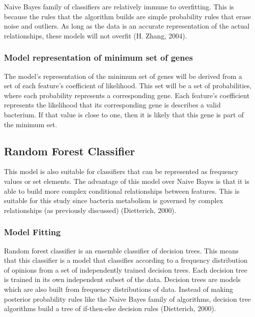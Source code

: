 \documentclass[]{report}
\begin{document}
Naive Bayes family of classifiers are relatively immune to overfitting.
This is because the rules that the algorithm builds are simple
probability rules that erase noise and outliers. As long as the data is
an accurate representation of the actual relationships, these models
will not overfit (H. Zhang, 2004).

\subsubsection{Model representation of minimum set of
genes}\label{model-representation-of-minimum-set-of-genes}

The model's representation of the minimum set of genes will be derived
from a set of each feature's coefficient of likelihood. This set will be
a set of probabilities, where each probability represents a
corresponding gene. Each feature's coefficient represents the likelihood
that its corresponding gene is describes a valid bacterium. If that
value is close to one, then it is likely that this gene is part of the
minimum set.

\subsection{Random Forest Classifier}\label{random-forest-classifier}

This model is also suitable for classifiers that can be represented as
frequency values or set elements. The advantage of this model over Naive
Bayes is that it is able to build more complex conditional relationships
between features. This is suitable for this study since bacteria
metabolism is governed by complex relationships (as previously
discussed) (Dietterich, 2000).

\subsubsection{Model Fitting}\label{model-fitting-1}

Random forest classifier is an ensemble classifier of decision trees.
This means that this classifier is a model that classifies according to
a frequency distribution of opinions from a set of independently trained
decision trees. Each decision tree is trained in its own independent
subset of the data. Decision trees are models which are also built from
frequency distributions of data. Instead of making posterior probability
rules like the Naive Bayes family of algorithms, decision tree
algorithms build a tree of if-then-else decision rules (Dietterich,
2000).
\end{document}
